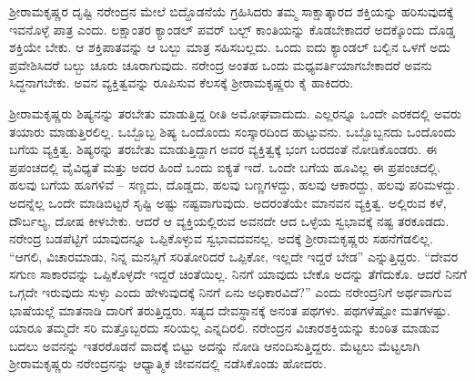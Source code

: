 ಶ‍್ರೀರಾಮಕೃಷ್ಣರ ದೃಷ್ಟಿ ನರೇಂದ್ರನ ಮೇಲೆ ಬಿದ್ದೊಡನೆಯೆ ಗ್ರಹಿಸಿದರು ತಮ್ಮ ಸಾಕ್ಷಾತ್ಕಾರದ ಶಕ್ತಿಯನ್ನು ಹರಿಸುವುದಕ್ಕೆ ಇವನೊಳ್ಳೆ ಪಾತ್ರ ಎಂದು. ಲಕ್ಷಾಂತರ ಕ್ಯಾಂಡಲ್ ಪವರ್ ಬಲ್ಬ್ ಕಾಂತಿಯನ್ನು ಕೊಡಬೇಕಾದರೆ ಅದಕ್ಕೊಂದು ದೊಡ್ಡ ಶಕ್ತಿಯೇ ಬೇಕು. ಆ ಶಕ್ತಿಪಾತವನ್ನು ಆ ಬಲ್ಬು ಮಾತ್ರ ಸಹಿಸಬಲ್ಲದು. ಒಂದು ಐದು ಕ್ಯಾಂಡಲ್ ಬಲ್ಬಿನ ಒಳಗೆ ಅದು ಪ್ರವೇಶಿಸಿದರೆ ಬಲ್ಬು ಚೂರು ಚೂರಾಗುವುದು. ನರೇಂದ್ರ ಅಂತಹ ಒಂದು ಮಧ್ಯವರ್ತಿಯಾಗಬೇಕಾದರೆ ಅವನು ಸಿದ್ಧನಾಗಬೇಕು. ಅವನ ವ್ಯಕ್ತಿತ್ವವನ್ನು ರೂಪಿಸುವ ಕೆಲಸಕ್ಕೆ ಶ‍್ರೀರಾಮಕೃಷ್ಣರು ಕೈ ಹಾಕಿದರು.

ಶ‍್ರೀರಾಮಕೃಷ್ಣರು ಶಿಷ್ಯನನ್ನು ತರಬೇತು ಮಾಡುತ್ತಿದ್ದ ರೀತಿ ಅಮೋಘವಾದುದು. ಎಲ್ಲರನ್ನೂ ಒಂದೇ ಎರಕದಲ್ಲಿ ಅವರು ತಯಾರು ಮಾಡುತ್ತಿರಲಿಲ್ಲ. ಒಬ್ಬೊಬ್ಬ ಶಿಷ್ಯ ಒಂದೊಂದು ಸಂಸ್ಕಾರದಿಂದ ಹುಟ್ಟುವನು. ಒಬ್ಬೊಬ್ಬನದು ಒಂದೊಂದು ಬಗೆಯ ವ್ಯಕ್ತಿತ್ವ. ಶಿಷ್ಯರನ್ನು ತರಬೇತು ಮಾಡುತ್ತಿದ್ದಾಗ ಅವರ ವ್ಯಕ್ತಿತ್ವಕ್ಕೆ ಭಂಗ ಬರದಂತೆ ನೋಡಿಕೊಂಡರು. ಈ ಪ್ರಪಂಚದಲ್ಲಿ ವೈವಿಧ್ಯತೆ ಮತ್ತು ಅದರ ಹಿಂದೆ ಒಂದು ಐಕ್ಯತೆ ಇದೆ. ಒಂದೇ ಬಗೆಯ ಹೂವಿಲ್ಲ ಈ ಪ್ರಪಂಚದಲ್ಲಿ. ಹಲವು ಬಗೆಯ ಹೂಗಳಿವೆ – ಸಣ್ಣದು, ದೊಡ್ಡದು, ಹಲವು ಬಣ್ಣಗಳದ್ದು, ಹಲವು ಆಕಾರದ್ದು, ಹಲವು ಪರಿಮಳದ್ದು. ಅದನ್ನೆಲ್ಲ ಒಂದೇ ಮಾಡಿಬಿಟ್ಟರೆ ಸೃಷ್ಟಿ ಅಷ್ಟು ನಷ್ಟವಾಗುವುದು. ಅದರಂತೆಯೇ ಮಾನವನ ವ್ಯಕ್ತಿತ್ವ. ಅಲ್ಲಿರುವ ಕಳೆ, ದೌರ್ಬಲ್ಯ, ದೋಷ ಕೀಳಬೇಕು. ಆದರೆ ಆ ವ್ಯಕ್ತಿಯಲ್ಲಿರುವ ಅವನದೇ ಆದ ಒಳ್ಳೆಯ ಸ್ವಭಾವಕ್ಕೆ ನಷ್ಟ ತರಕೂಡದು. ನರೇಂದ್ರ ಬಡಪೆಟ್ಟಿಗೆ ಯಾವುದನ್ನೂ ಒಪ್ಪಿಕೊಳ್ಳುವ ಸ್ವಭಾವದವನಲ್ಲ. ಅದಕ್ಕೆ ಶ‍್ರೀರಾಮಕೃಷ್ಣರು ಸಹನೆಗೆಡಲಿಲ್ಲ. “ಆಗಲಿ, ವಿಚಾರಮಾಡು, ನಿನ್ನ ಮನಸ್ಸಿಗೆ ಸರಿತೋರಿದರೆ ಒಪ್ಪಿಕೋ, ಇಲ್ಲದೇ ಇದ್ದರೆ ಬೇಡ” ಎನ್ನುತ್ತಿದ್ದರು. “ದೇವರ ಸಗುಣ ಸಾಕಾರವನ್ನು ಒಪ್ಪಿಕೊಳ್ಳದೇ ಇದ್ದರೆ ಚಿಂತೆಯಿಲ್ಲ. ನಿನಗೆ ಯಾವುದು ಬೇಕೊ ಅದನ್ನು ತೆಗೆದುಕೊ. ಆದರೆ ನಿನಗೆ ಒಗ್ಗದೇ ಇರುವುದು ಸುಳ್ಳು ಎಂದು ಹೇಳುವುದಕ್ಕೆ ನಿನಗೆ ಏನು ಅಧಿಕಾರವಿದೆ?” ಎಂದು ನರೇಂದ್ರನಿಗೆ ಅರ್ಥವಾಗುವ ಭಾಷೆಯಲ್ಲೆ ಮಾತನಾಡಿ ದಾರಿಗೆ ತರುತ್ತಿದ್ದರು. ಸತ್ಯದ ದೇವಸ್ಥಾನಕ್ಕೆ ಅನಂತ ಪಥಗಳು. ಪಥಗಳೆಷ್ಟೋ ಮತಗಳಷ್ಟು. ಯಾರೂ ತಮ್ಮದೇ ಸರಿ ಮತ್ತೊಬ್ಬರದು ಸರಿಯಲ್ಲ ಎನ್ನದಿರಲಿ. ನರೇಂದ್ರನ ವಿಚಾರಶಕ್ತಿಯನ್ನು ಕುಂಠಿತ ಮಾಡುವ ಬದಲು ಅವನನ್ನು ಇತರರೊಡನೆ ವಾದಕ್ಕೆ ಬಿಟ್ಟು ಅದನ್ನು ನೋಡಿ ಆನಂದಿಸುತ್ತಿದ್ದರು. ಮೆಟ್ಟಲು ಮೆಟ್ಟಲಾಗಿ ಶ‍್ರೀರಾಮಕೃಷ್ಣರು ನರೇಂದ್ರನನ್ನು ಆಧ್ಯಾತ್ಮಿಕ ಜೀವನದಲ್ಲಿ ನಡೆಸಿಕೊಂಡು ಹೋದರು.

